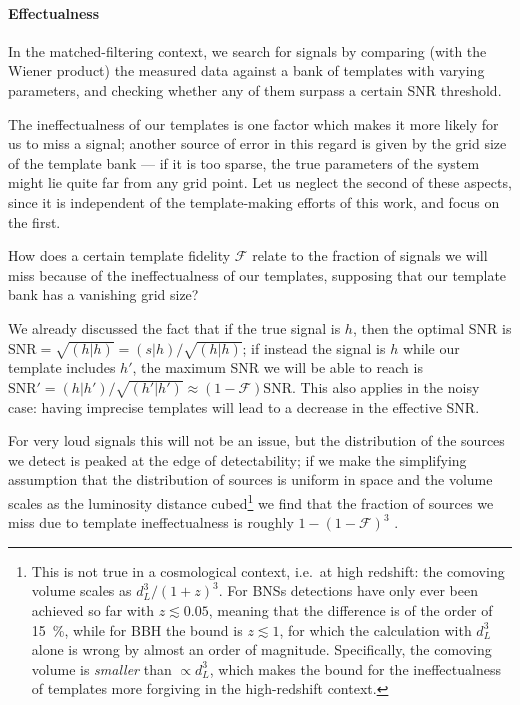 \documentclass[main.tex]{subfiles}
\begin{document}
\paragraph{Effectualness}

In the matched-filtering context, we search for signals by comparing (with the Wiener product) the measured data against a bank of templates with varying parameters, and checking whether any of them surpass a certain \ac{SNR} threshold.

The ineffectualness of our templates is one factor which makes it more likely for us to miss a signal; another source of error in this regard is given by the grid size of the template bank --- if it is too sparse, the true parameters of the system might lie quite far from any grid point.
Let us neglect the second of these aspects, since it is independent of the template-making efforts of this work, and focus on the first. 

How does a certain template fidelity \(\mathcal{F}\) relate to the fraction of signals we will miss because of the ineffectualness of our templates, supposing that our template bank has a vanishing grid size? 

We already discussed the fact that if the true signal is \(h\), then the optimal \ac{SNR} is \(\text{SNR} = \sqrt{(h|h)} = (s|h) / \sqrt{(h|h)}\); if instead the signal is \(h\) while our template includes \(h'\), the maximum \ac{SNR} we will be able to reach is \(\text{SNR}' = (h|h') / \sqrt{(h'|h')} \approx (1 - \mathcal{F}) \text{SNR}\). 
This also applies in the noisy case: having imprecise templates will lead to a decrease in the effective \ac{SNR}. 

For very loud signals this will not be an issue, but the distribution of the sources we detect is peaked at the edge of detectability; if we make the simplifying assumption that the distribution of sources is uniform in space and the volume scales as the luminosity distance cubed\footnote{This is not true in a cosmological context, i.e.\ at high redshift: the comoving volume scales as \(d_L^3 / (1+z)^3\). For \acp{BNS} detections have only ever been achieved so far with \(z \lesssim 0.05\), meaning that the difference is of the order of \SI{15}{\%}, while for \ac{BBH} the bound is \(z\lesssim 1\), for which the calculation with \(d_L^3\) alone is wrong by almost an order of magnitude. Specifically, the comoving volume is \emph{smaller} than \(\propto d_L^3\), which makes the bound for the ineffectualness of templates more forgiving in the high-redshift context.} we find that the fraction of sources we miss due to template ineffectualness is roughly \(1 - (1-\mathcal{F})^3\) \cites[eq.\ 18]{damourAccuracyEffectualnessClosedform2011}[eq.\ 2.21]{owenSearchTemplatesGravitational1996}.
\end{document}

